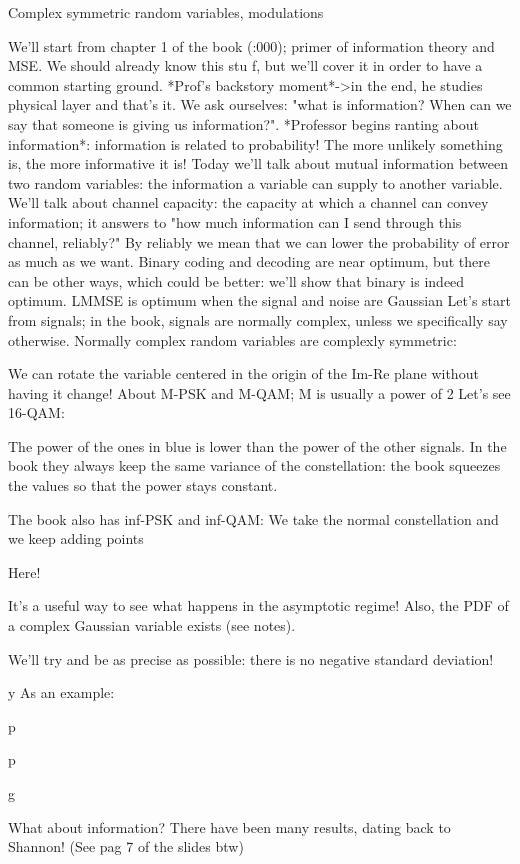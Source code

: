 \infty

Complex symmetric random variables, \infty modulations

We'll start from chapter 1 of the book (:000); primer of information theory and MSE.
We should already know this stu f, but we'll cover it in order to have a common starting ground.
*Prof's backstory moment*->in the end, he studies physical layer and that's it.
We ask ourselves: "what is information? When can we say that someone is giving us information?".
*Professor begins ranting about information*: information is related to probability! The more unlikely something is, the more informative it is!
Today we'll talk about mutual information between two random variables: the information a variable can supply to another variable.
We'll talk about channel capacity: the capacity at which a channel can convey information; it answers to "how much information can I send through this channel, reliably?" By reliably we mean that we can lower the probability of error as much as we want.
Binary coding and decoding are near optimum, but there can be other ways, which could be better: we'll show that binary is indeed optimum.
LMMSE is optimum when the signal and noise are Gaussian Let's start from signals; in the book, signals are normally complex, unless we specifically say otherwise.
Normally complex random variables are complexly symmetric:

We can rotate the variable centered in the origin of the Im-Re plane without having it change!
About M-PSK and M-QAM; M is usually a power of 2 Let's see 16-QAM:

The power of the ones in blue is lower than the power of the other signals.
In the book they always keep the same variance of the constellation: the book squeezes the values so that the power stays constant.

The book also has inf-PSK and inf-QAM: We take the normal constellation and we keep adding points

Here!

It's a useful way to see what happens in the asymptotic regime!
Also, the PDF of a complex Gaussian variable exists (see notes).

We'll try and be as precise as possible: there is no negative standard deviation!

y As an example:

p

p

g

What about information? There have been many results, dating back to Shannon!
(See pag 7 of the slides btw)

